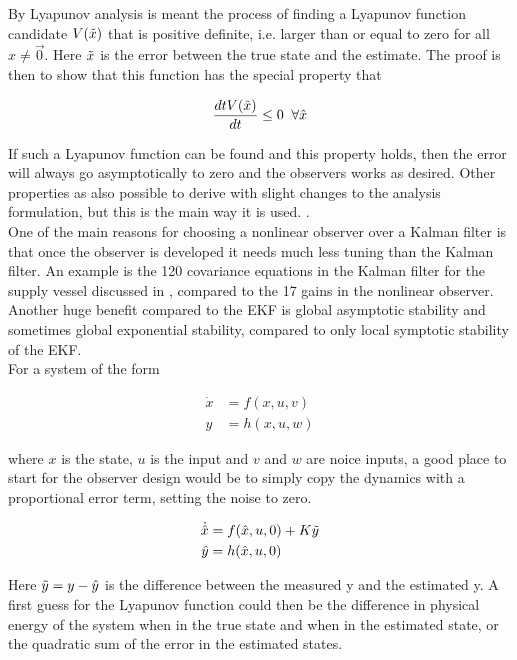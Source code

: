 By Lyapunov analysis\cite{Lyapunov} is meant the process of finding a Lyapunov function candidate $V(\Tilde{x})$ that is positive definite, i.e. larger than or equal to zero for all $x\neq \Vec{0}$. Here $\Tilde{x}$ is the error between the true state and the estimate. The proof is then to show that this function has the special property that

\begin{equation}
    \frac{dt V(\Tilde{x})}{dt} \leq 0 \;\; \forall \hat{x}
\end{equation}

If such a Lyapunov function can be found and this property holds, then the error will always go asymptotically to zero and the observers works as desired. Other properties as also possible to derive with slight changes to the analysis formulation, but this is the main way it is used.  . \\

One of the main reasons for choosing a nonlinear observer over a Kalman filter is that once the observer is developed it needs much less tuning than the Kalman filter. An example is the 120 covariance equations in the Kalman filter for the supply vessel discussed in \cite{PassiveFossen}, compared to the 17 gains in the nonlinear observer. Another huge benefit compared to the EKF is global asymptotic stability and sometimes global exponential stability, compared to only local symptotic stability of the EKF. \\ 

For a system of the form 

\begin{align}
    \Dot{x} &= f(x,u,v) \\
    y &= h(x,u,w)
\end{align}

where $x$ is the state, $u$ is the input and $v$ and $w$ are noice inputs, a good place to start for the observer design would be to simply copy the dynamics with a proportional error term, setting the noise to zero.

\begin{align}
    \Dot{\hat{x}} &= f(\hat{x}, u, 0) + K\Tilde{y} \\
    \hat{y} &= h(\hat{x}, u, 0)
\end{align}

Here $\Tilde{y} = y -  \hat{y}$ is the difference between the measured y and the estimated y. A first guess for the Lyapunov function could then be the difference in physical energy of the system when in the true state and when in the estimated state, or the quadratic sum of the error in the estimated states. 